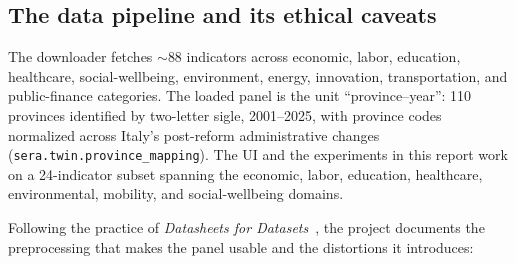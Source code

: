 \documentclass[11pt,a4paper]{article}
\newcommand{\code}[1]{\texttt{#1}}
\begin{document}
\subsection{The data pipeline and its ethical caveats}
\label{sec:data}

The downloader fetches $\sim$88 indicators across economic, labor, education,
healthcare, social-wellbeing, environment, energy, innovation, transportation,
and public-finance categories. The loaded panel is the unit ``province--year'':
110 provinces identified by two-letter sigle, 2001--2025, with province codes
normalized across Italy's post-reform administrative changes
(\code{sera.twin.province\_mapping}). The UI and the experiments in this report
work on a 24-indicator subset spanning the economic, labor, education,
healthcare, environmental, mobility, and social-wellbeing domains.

Following the practice of \emph{Datasheets for Datasets}~\cite{gebru2021}, the
project documents the preprocessing that makes the panel usable and the
distortions it introduces:
\end{document}
